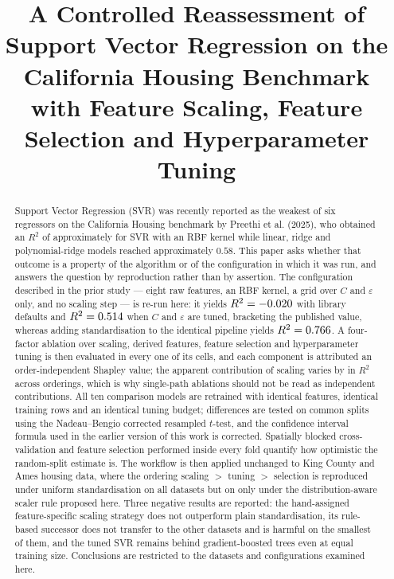 \documentclass[pdflatex,sn-mathphys-num]{sn-jnl}
\begin{document}
\title[Reassessing SVR on California Housing]{A Controlled Reassessment of Support Vector Regression on the California Housing Benchmark with Feature Scaling, Feature Selection and Hyperparameter Tuning}

\author*[1]{ }


\maketitle

\begin{abstract}
\noindent Support Vector Regression (SVR) was recently reported as the weakest of six regressors on the California Housing benchmark by Preethi et al. (2025), who obtained an $R^2$ of approximately \PreethiReportedRtwo{} for SVR with an RBF kernel while linear, ridge and polynomial-ridge models reached approximately $0.58$. This paper asks whether that outcome is a property of the algorithm or of the configuration in which it was run, and answers the question by reproduction rather than by assertion. The configuration described in the prior study --- eight raw features, an RBF kernel, a grid over $C$ and $\varepsilon$ only, and no scaling step --- is re-run here: it yields $R^2 = -0.020$ with library defaults and $R^2 = 0.514$ when $C$ and $\varepsilon$ are tuned, bracketing the published value, whereas adding standardisation to the identical pipeline yields $R^2 = 0.766$. A four-factor ablation over scaling, derived features, feature selection and hyperparameter tuning is then evaluated in every one of its \AblNcells{} cells, and each component is attributed an order-independent Shapley value; the apparent contribution of scaling varies by \RangeScal{} in $R^2$ across orderings, which is why single-path ablations should not be read as independent contributions. All ten comparison models are retrained with identical features, identical training rows and an identical tuning budget; differences are tested on \StatSplits{} common splits using the Nadeau--Bengio corrected resampled $t$-test, and the confidence interval formula used in the earlier version of this work is corrected. Spatially blocked cross-validation and feature selection performed inside every fold quantify how optimistic the random-split estimate is. The workflow is then applied unchanged to King County and Ames housing data, where the ordering scaling $>$ tuning $>$ selection is reproduced under uniform standardisation on all \NOrderHoldsUni{} datasets but on only \NOrderHoldsAuto{} under the distribution-aware scaler rule proposed here. Three negative results are reported: the hand-assigned feature-specific scaling strategy does not outperform plain standardisation, its rule-based successor does not transfer to the other datasets and is harmful on the smallest of them, and the tuned SVR remains behind gradient-boosted trees even at equal training size. Conclusions are restricted to the datasets and configurations examined here.
\end{abstract}
\end{document}
